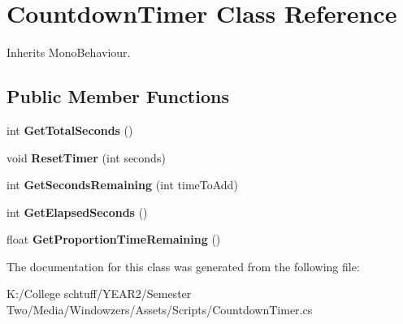 \hypertarget{class_countdown_timer}{}\section{Countdown\+Timer Class Reference}
\label{class_countdown_timer}


Inherits Mono\+Behaviour.

\subsection*{Public Member Functions}
\begin{DoxyCompactItemize}
\item 
\mbox{\label{class_countdown_timer_a2cd8adb6aa9379d69377a7558c547843}} 
int {\bfseries Get\+Total\+Seconds} ()
\item 
\mbox{\label{class_countdown_timer_a08074e905fd72638a3c9e8805ae64457}} 
void {\bfseries Reset\+Timer} (int seconds)
\item 
\mbox{\label{class_countdown_timer_a36555f44887b885ca6d0c19a1ba63a6d}} 
int {\bfseries Get\+Seconds\+Remaining} (int time\+To\+Add)
\item 
\mbox{\label{class_countdown_timer_a29013b7cd00b5149196040f437db3882}} 
int {\bfseries Get\+Elapsed\+Seconds} ()
\item 
\mbox{\label{class_countdown_timer_a7eec3f15b6c8d0958b9b67550de16599}} 
float {\bfseries Get\+Proportion\+Time\+Remaining} ()
\end{DoxyCompactItemize}


The documentation for this class was generated from the following file\+:\begin{DoxyCompactItemize}
\item 
K\+:/\+College schtuff/\+Y\+E\+A\+R2/\+Semester Two/\+Media/\+Windowzers/\+Assets/\+Scripts/Countdown\+Timer.\+cs\end{DoxyCompactItemize}
